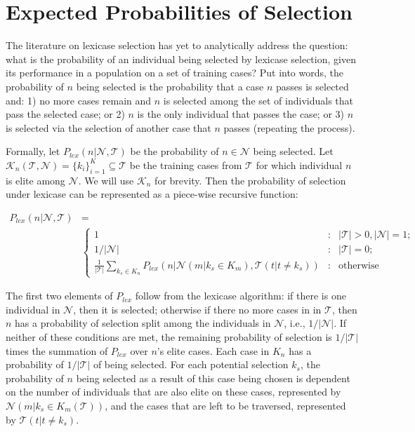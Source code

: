 \documentclass[twoside]{article}
\begin{document}
\section{Expected Probabilities of Selection}\label{s:prob}
The literature on lexicase selection has yet to analytically address the question: what is the probability of an individual being selected by lexicase selection, given its performance in a population on a set of training cases?  Put into words, the probability of $n$ being selected is the probability that a case $n$ passes is selected and: 1) no more cases remain and $n$ is selected among the set of individuals that pass the selected case; or 2) $n$ is the only individual that passes the case; or 3) $n$ is selected via the selection of another case that $n$ passes (repeating the process). 

Formally, let $P_{lex}(n | \mathcal{N}, \mathcal{T})$ be the probability of $n \in \mathcal{N}$ being selected. Let $\mathcal{K}_n(\mathcal{T},\mathcal{N}) = \{k_i\}_{i=1}^K \subseteq \mathcal{T}$ be the training cases from $\mathcal{T}$ for which individual $n$ is elite among $\mathcal{N}$. We will use $\mathcal{K}_n$ for brevity. Then the probability of selection under lexicase can be represented as a piece-wise recursive function: 


{\scriptsize
\begin{align}\label{eq:prob}
P_{lex}(n | \mathcal{N}, \mathcal{T}) &= \\
 &\left\{\nonumber 
     \begin{array}{lcr}
       1 & : & |\mathcal{T}| >0, |\mathcal{N}| = 1; \\
       1/|\mathcal{N}| & : &|\mathcal{T}| = 0; \\ 
       \frac{1}{|\mathcal{T}|}\sum_{k_s \in K_n}{P_{lex} \left( n | \mathcal{N}(m|k_s \in K_m), \mathcal{T}(t|t \neq k_s) \right)} & : & \text{otherwise}
     \end{array}
   \right. 
\end{align}
}

The first two elements of $P_{lex}$ follow from the lexicase algorithm: if there is one individual in $\mathcal{N}$, then it is selected; otherwise if there no more cases in in $\mathcal{T}$, then $n$ has a probability of selection split among the individuals in $\mathcal{N}$, i.e.,  $1/|\mathcal{N}|$. If neither of these conditions are met, the remaining probability of selection is $1/|\mathcal{T}|$ times the summation of $P_{lex}$ over $n$'s elite cases. Each case in $K_n$ has a probability of $1/|\mathcal{T}|$ of being selected. For each potential selection $k_s$, the probability of $n$ being selected as a result of this case being chosen is dependent on the number of individuals that are also elite on these cases, represented by $\mathcal{N}(m|k_s \in K_m(\mathcal{T}))$, and the cases that are left to be traversed, represented by $\mathcal{T}(t|t \neq k_s)$. 
\end{document}
